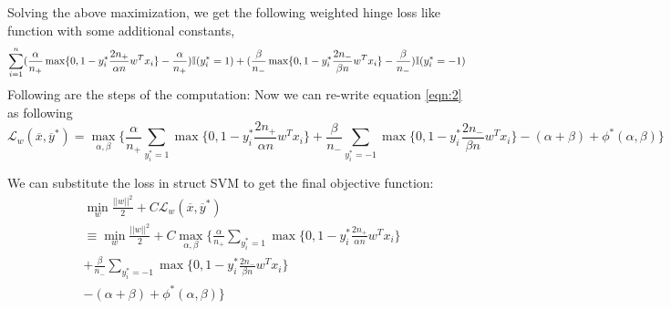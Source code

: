 \documentclass{article} %
\begin{document}
Solving the above maximization, we get the following weighted hinge loss like function with some additional constants,
\begin{equation*}
\sum_{i=1}^n
(\frac{\alpha}{n_+}\max\{0,1-y_i^*\frac{2n_+}{\alpha n}w^Tx_i\}
- \frac{\alpha}{n_+})\mathbb{I}(y^*_i=1)\\
+ (\frac{\beta}{n_-}\max\{0,1-y_i^*\frac{2n_-}{\beta n}w^Tx_i\}
- \frac{\beta}{n_-})\mathbb{I}(y^*_i=-1)
\end{equation*}
Following are the steps of the computation:
Now we can re-write equation \ref{eqn:2} as following
\begin{equation*}
\mathcal L_w(\overline{x},\overline{y}^*) = \max_{\alpha,\beta}\{
\frac{\alpha}{n_+}\sum_{y_i^*=1}\max\{0,1-y_i^*\frac{2n_+}{\alpha n}w^Tx_i\}+\frac{\beta}{n_-}\sum_{y_i^*=-1}\max\{0,1-y_i^*\frac{2n_-}{\beta n}w^Tx_i\}-(\alpha+\beta)+\phi^*(\alpha,\beta)\}
\end{equation*}

We can substitute the loss in struct SVM to get the final objective function:
\begin{equation*}
\begin{split}
	&\min_w \frac{||w||^2}{2} + C \mathcal L_w(\overline{x},\overline{y}^*)\\
	&\equiv \min_w \frac{||w||^2}{2} + C\max_{\alpha,\beta}\{
	\frac{\alpha}{n_+}\sum_{y_i^*=1}\max\{0,1-y_i^*\frac{2n_+}{\alpha n}w^Tx_i\}\\
	&+ \frac{\beta}{n_-}\sum_{y_i^*=-1}\max\{0,1-y_i^*\frac{2n_-}{\beta n}w^Tx_i\}\\
	&-(\alpha+\beta)+\phi^*(\alpha,\beta)\}
\end{split}
\end{equation*}
\end{document}
